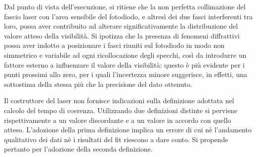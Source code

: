 \documentclass[10pt,oneside,a4paper]{article}
\begin{document}
\begin{multicols}{2}
Dal punto di vista dell'esecuzione, si ritiene che la non perfetta collimazione del fascio laser con l'area sensibile del fotodiodo, e altresì dei due fasci interferenti tra loro, possa aver contribuito ad alterare significativamente la distribuzione del valore atteso della visibilità. Si ipotizza che la presenza di fenomeni diffrattivi possa aver indotto a posizionare i fasci riuniti sul fotodiodo in modo non simmetrico e variabile ad ogni ricollocazione degli specchi, così da introdurre un fattore esterno a influenzare il valore della visibilità: questo è più evidente per i punti prossimi allo zero, per i quali l'incertezza minore suggerisce, in effetti, una sottostima della stessa più che la precisione del dato ottenuto. 

Il costruttore del laser non fornisce indicazioni sulla definizione adottata nel calcolo del tempo di coerenza. Utilizzando due definizioni distinte si perviene rispettivamente a un valore discordante e a un valore in accordo con quello atteso. L'adozione della prima definizione implica un errore di cui nè l'andamento qualitativo dei dati nè i risultati del fit riescono a dare conto. Si propende pertanto per l'adozione della seconda definizione.





\end{multicols}


\newpage
\end{document}
